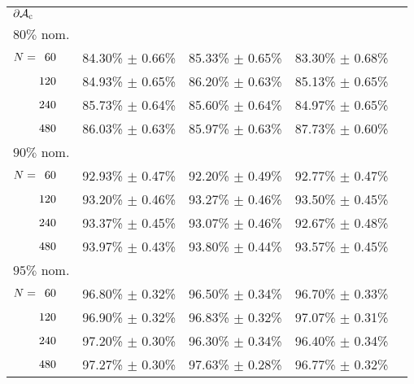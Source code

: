 \begin{table}[htbp]
\begin{tabular}{@{}p{}*{4}{L{\tabcolsep\relax}}@{}}
\midrule
$\mathbf{\operatorname{\partial\mathcal{A}_{c}}}$\\[-0.4em]
$80\%$ nom.\\[-0.4em]
$N = \hphantom{1}60$ & 84.30\% $\pm$ 0.66\% & 85.33\% $\pm$ 0.65\% & 83.30\% $\pm$ 0.68\% & \\[-0.4em]
$\hphantom{N{}={}}120$ & 84.93\% $\pm$ 0.65\% & 86.20\% $\pm$ 0.63\% & 85.13\% $\pm$ 0.65\% & \\[-0.4em]
$\hphantom{N{}={}}240$ & 85.73\% $\pm$ 0.64\% & 85.60\% $\pm$ 0.64\% & 84.97\% $\pm$ 0.65\% & \\[-0.4em]
$\hphantom{N{}={}}480$ & 86.03\% $\pm$ 0.63\% & 85.97\% $\pm$ 0.63\% & 87.73\% $\pm$ 0.60\%\\ 
$90\%$ nom.  \\[-0.4em]
$N = \hphantom{1}60$ & 92.93\% $\pm$ 0.47\% & 92.20\% $\pm$ 0.49\% & 92.77\% $\pm$ 0.47\% & \\[-0.4em]
$\hphantom{N{}={}}120$ & 93.20\% $\pm$ 0.46\% & 93.27\% $\pm$ 0.46\% & 93.50\% $\pm$ 0.45\% & \\[-0.4em]
$\hphantom{N{}={}}240$ & 93.37\% $\pm$ 0.45\% & 93.07\% $\pm$ 0.46\% & 92.67\% $\pm$ 0.48\% & \\[-0.4em]
$\hphantom{N{}={}}480$ & 93.97\% $\pm$ 0.43\% & 93.80\% $\pm$ 0.44\% & 93.57\% $\pm$ 0.45\%\\ 
$95\%$ nom.  \\[-0.4em]
$N = \hphantom{1}60$ & 96.80\% $\pm$ 0.32\% & 96.50\% $\pm$ 0.34\% & 96.70\% $\pm$ 0.33\% & \\[-0.4em]
$\hphantom{N{}={}}120$ & 96.90\% $\pm$ 0.32\% & 96.83\% $\pm$ 0.32\% & 97.07\% $\pm$ 0.31\% & \\[-0.4em]
$\hphantom{N{}={}}240$ & 97.20\% $\pm$ 0.30\% & 96.30\% $\pm$ 0.34\% & 96.40\% $\pm$ 0.34\% & \\[-0.4em]
$\hphantom{N{}={}}480$ & 97.27\% $\pm$ 0.30\% & 97.63\% $\pm$ 0.28\% & 96.77\% $\pm$ 0.32\%\\
\bottomrule
\end{tabular}
\end{table}